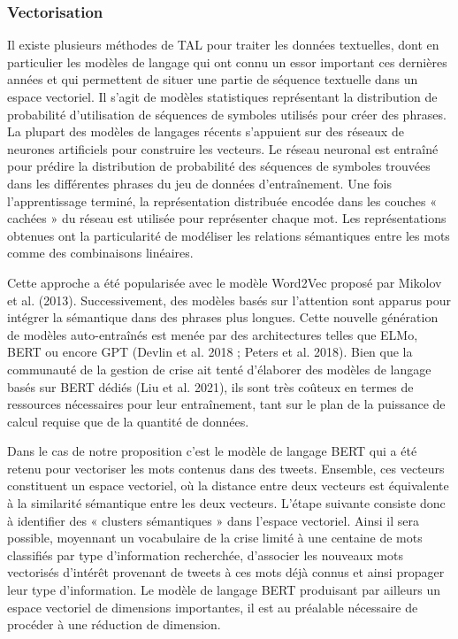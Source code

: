 \subsubsection*{Vectorisation}

Il existe plusieurs méthodes de TAL pour traiter les données textuelles, dont
en particulier les modèles de langage qui ont connu un essor important ces
dernières années et qui permettent de situer une partie de séquence textuelle dans
un espace vectoriel. Il s'agit de modèles statistiques représentant la distribution
de probabilité d'utilisation de séquences de symboles utilisés pour créer des
phrases. La plupart des modèles de langages récents s'appuient sur des réseaux
de neurones artificiels pour construire les vecteurs. Le réseau neuronal est
entraîné pour prédire la distribution de probabilité des séquences de symboles
trouvées dans les différentes phrases du jeu de données d'entraînement. Une fois
l'apprentissage terminé, la représentation distribuée encodée dans les couches
« cachées » du réseau est utilisée pour représenter chaque mot. Les représentations
obtenues ont la particularité de modéliser les relations sémantiques entre les mots
comme des combinaisons linéaires.

Cette approche a été popularisée avec le modèle Word2Vec proposé par Mikolov
et al. (2013). Successivement, des modèles basés sur l'attention sont apparus pour
intégrer la sémantique dans des phrases plus longues. Cette nouvelle génération de
modèles auto-entraînés est menée par des architectures telles que ELMo, BERT
ou encore GPT (Devlin et al. 2018 ; Peters et al. 2018). Bien que la communauté
de la gestion de crise ait tenté d'élaborer des modèles de langage basés sur BERT
dédiés (Liu et al. 2021), ils sont très coûteux en termes de ressources nécessaires
pour leur entraînement, tant sur le plan de la puissance de calcul requise que de
la quantité de données.

Dans le cas de notre proposition c'est le modèle de langage BERT qui a été
retenu pour vectoriser les mots contenus dans des tweets. Ensemble, ces vecteurs
constituent un espace vectoriel, où la distance entre deux vecteurs est équivalente
à la similarité sémantique entre les deux vecteurs. L'étape suivante consiste donc à
identifier des « clusters sémantiques » dans l'espace vectoriel. Ainsi il sera possible,
moyennant un vocabulaire de la crise limité à une centaine de mots classifiés
par type d'information recherchée, d'associer les nouveaux mots vectorisés
d'intérêt provenant de tweets à ces mots déjà connus et ainsi propager leur type
d'information. Le modèle de langage BERT produisant par ailleurs un espace
vectoriel de dimensions importantes, il est au préalable nécessaire de procéder à
une réduction de dimension.

